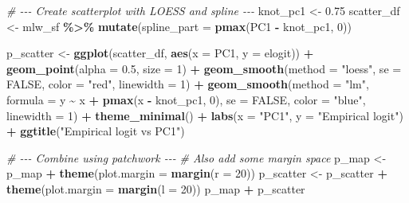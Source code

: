 \documentclass[
  letterpaper,
]{krantz}
\newenvironment{Shaded}{\begin{snugshade}}{\end{snugshade}}
\newcommand{\AttributeTok}[1]{\textcolor[rgb]{0.13,0.29,0.53}{#1}}
\newcommand{\CommentTok}[1]{\textcolor[rgb]{0.56,0.35,0.01}{\textit{#1}}}
\newcommand{\ConstantTok}[1]{\textcolor[rgb]{0.56,0.35,0.01}{#1}}
\newcommand{\DecValTok}[1]{\textcolor[rgb]{0.00,0.00,0.81}{#1}}
\newcommand{\FloatTok}[1]{\textcolor[rgb]{0.00,0.00,0.81}{#1}}
\newcommand{\FunctionTok}[1]{\textcolor[rgb]{0.13,0.29,0.53}{\textbf{#1}}}
\newcommand{\NormalTok}[1]{#1}
\newcommand{\OtherTok}[1]{\textcolor[rgb]{0.56,0.35,0.01}{#1}}
\newcommand{\SpecialCharTok}[1]{\textcolor[rgb]{0.81,0.36,0.00}{\textbf{#1}}}
\newcommand{\StringTok}[1]{\textcolor[rgb]{0.31,0.60,0.02}{#1}}
\begin{document}
\begin{Shaded}
\begin{Highlighting}[]
\CommentTok{\# {-}{-}{-} Create scatterplot with LOESS and spline {-}{-}{-}}
\NormalTok{knot\_pc1 }\OtherTok{\textless{}{-}} \FloatTok{0.75}
\NormalTok{scatter\_df }\OtherTok{\textless{}{-}}\NormalTok{ mlw\_sf }\SpecialCharTok{\%\textgreater{}\%}
  \FunctionTok{mutate}\NormalTok{(}\AttributeTok{spline\_part =} \FunctionTok{pmax}\NormalTok{(PC1 }\SpecialCharTok{{-}}\NormalTok{ knot\_pc1, }\DecValTok{0}\NormalTok{))}

\NormalTok{p\_scatter }\OtherTok{\textless{}{-}} \FunctionTok{ggplot}\NormalTok{(scatter\_df, }\FunctionTok{aes}\NormalTok{(}\AttributeTok{x =}\NormalTok{ PC1, }\AttributeTok{y =}\NormalTok{ elogit)) }\SpecialCharTok{+}
  \FunctionTok{geom\_point}\NormalTok{(}\AttributeTok{alpha =} \FloatTok{0.5}\NormalTok{, }\AttributeTok{size =} \DecValTok{1}\NormalTok{) }\SpecialCharTok{+}
  \FunctionTok{geom\_smooth}\NormalTok{(}\AttributeTok{method =} \StringTok{"loess"}\NormalTok{, }\AttributeTok{se =} \ConstantTok{FALSE}\NormalTok{, }\AttributeTok{color =} \StringTok{"red"}\NormalTok{, }\AttributeTok{linewidth =} \DecValTok{1}\NormalTok{) }\SpecialCharTok{+}
  \FunctionTok{geom\_smooth}\NormalTok{(}\AttributeTok{method =} \StringTok{"lm"}\NormalTok{, }\AttributeTok{formula =}\NormalTok{ y }\SpecialCharTok{\textasciitilde{}}\NormalTok{ x }\SpecialCharTok{+} \FunctionTok{pmax}\NormalTok{(x }\SpecialCharTok{{-}}\NormalTok{ knot\_pc1, }\DecValTok{0}\NormalTok{),}
              \AttributeTok{se =} \ConstantTok{FALSE}\NormalTok{, }\AttributeTok{color =} \StringTok{"blue"}\NormalTok{, }\AttributeTok{linewidth =} \DecValTok{1}\NormalTok{) }\SpecialCharTok{+}
  \FunctionTok{theme\_minimal}\NormalTok{() }\SpecialCharTok{+}
  \FunctionTok{labs}\NormalTok{(}\AttributeTok{x =} \StringTok{"PC1"}\NormalTok{, }\AttributeTok{y =} \StringTok{"Empirical logit"}\NormalTok{) }\SpecialCharTok{+}
  \FunctionTok{ggtitle}\NormalTok{(}\StringTok{"Empirical logit vs PC1"}\NormalTok{)}

\CommentTok{\# {-}{-}{-} Combine using patchwork {-}{-}{-}}
\CommentTok{\# Also add some margin space}
\NormalTok{p\_map }\OtherTok{\textless{}{-}}\NormalTok{ p\_map }\SpecialCharTok{+} \FunctionTok{theme}\NormalTok{(}\AttributeTok{plot.margin =} \FunctionTok{margin}\NormalTok{(}\AttributeTok{r =} \DecValTok{20}\NormalTok{))}
\NormalTok{p\_scatter }\OtherTok{\textless{}{-}}\NormalTok{ p\_scatter }\SpecialCharTok{+} \FunctionTok{theme}\NormalTok{(}\AttributeTok{plot.margin =} \FunctionTok{margin}\NormalTok{(}\AttributeTok{l =} \DecValTok{20}\NormalTok{))}
\NormalTok{p\_map }\SpecialCharTok{+}\NormalTok{ p\_scatter}
\end{Highlighting}
\end{Shaded}
\end{document}
